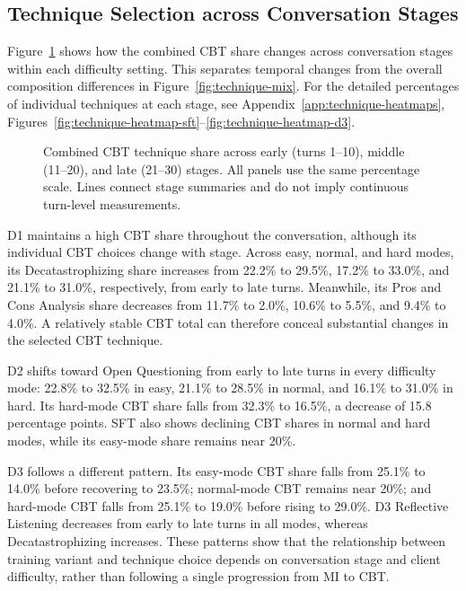 \subsection{Technique Selection across Conversation Stages}

Figure~\ref{fig:technique-cbt-stages} shows how the combined CBT share changes across conversation stages within each difficulty setting. This separates temporal changes from the overall composition differences in Figure~\ref{fig:technique-mix}. For the detailed percentages of individual techniques at each stage, see Appendix~\ref{app:technique-heatmaps}, Figures~\ref{fig:technique-heatmap-sft}--\ref{fig:technique-heatmap-d3}.

\begin{figure}[H]
\centering

\caption{Combined CBT technique share across early (turns 1--10), middle (11--20), and late (21--30) stages. All panels use the same percentage scale. Lines connect stage summaries and do not imply continuous turn-level measurements.}
\label{fig:technique-cbt-stages}
\end{figure}

D1 maintains a high CBT share throughout the conversation, although its individual CBT choices change with stage. Across easy, normal, and hard modes, its Decatastrophizing share increases from 22.2\% to 29.5\%, 17.2\% to 33.0\%, and 21.1\% to 31.0\%, respectively, from early to late turns. Meanwhile, its Pros and Cons Analysis share decreases from 11.7\% to 2.0\%, 10.6\% to 5.5\%, and 9.4\% to 4.0\%. A relatively stable CBT total can therefore conceal substantial changes in the selected CBT technique.

D2 shifts toward Open Questioning from early to late turns in every difficulty mode: 22.8\% to 32.5\% in easy, 21.1\% to 28.5\% in normal, and 16.1\% to 31.0\% in hard. Its hard-mode CBT share falls from 32.3\% to 16.5\%, a decrease of 15.8 percentage points. SFT also shows declining CBT shares in normal and hard modes, while its easy-mode share remains near 20\%.

D3 follows a different pattern. Its easy-mode CBT share falls from 25.1\% to 14.0\% before recovering to 23.5\%; normal-mode CBT remains near 20\%; and hard-mode CBT falls from 25.1\% to 19.0\% before rising to 29.0\%. D3 Reflective Listening decreases from early to late turns in all modes, whereas Decatastrophizing increases. These patterns show that the relationship between training variant and technique choice depends on conversation stage and client difficulty, rather than following a single progression from MI to CBT.

